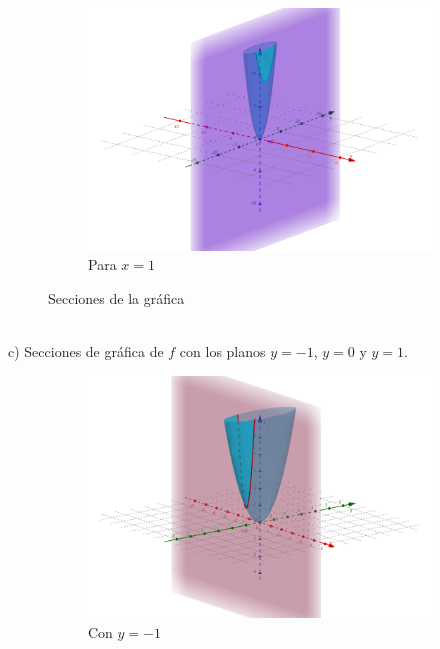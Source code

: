\documentclass[letterpaper,11pt]{article}
\begin{document}
\begin{enumerate}
\begin{figure}[h!]
\begin{subfigure}{0.3\textwidth}
		\includegraphics[width=\linewidth]{img/1b3}
		\caption{Para $ x = 1 $}
	\end{subfigure}
	\caption{Secciones de la gráfica }
\end{figure}\\
c) Secciones de gráfica de $f$ con los planos $y = -1$, $y = 0$ y $y = 1$.\\
\begin{figure}[h!]
	\centering
	\begin{subfigure}{0.3\textwidth}
		\includegraphics[width=\linewidth]{img/1c1}
		\caption{Con $ y = -1 $}
	\end{subfigure}
	\begin{subfigure}{0.3\textwidth}

\end{subfigure}
\end{figure}
\end{enumerate}
\end{document}
